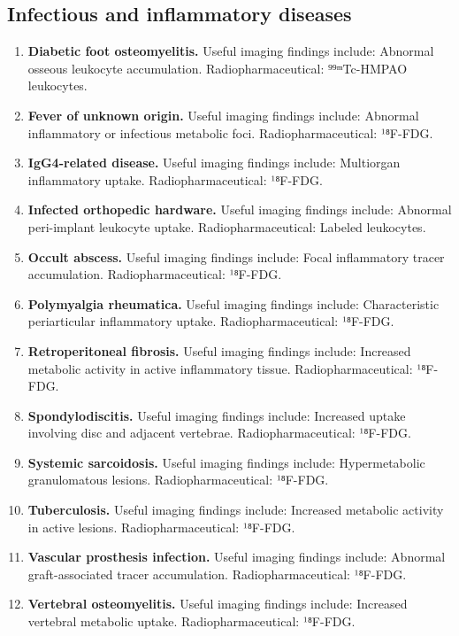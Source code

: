 \subsection{Infectious and inflammatory diseases}
\begin{enumerate}[leftmargin=*,itemsep=0.45em,topsep=0.4em]
\item \textbf{Diabetic foot osteomyelitis.} Useful imaging findings include: Abnormal osseous leukocyte accumulation. Radiopharmaceutical: ⁹⁹ᵐTc-HMPAO leukocytes.
\item \textbf{Fever of unknown origin.} Useful imaging findings include: Abnormal inflammatory or infectious metabolic foci. Radiopharmaceutical: ¹⁸F-FDG.
\item \textbf{IgG4-related disease.} Useful imaging findings include: Multiorgan inflammatory uptake. Radiopharmaceutical: ¹⁸F-FDG.
\item \textbf{Infected orthopedic hardware.} Useful imaging findings include: Abnormal peri-implant leukocyte uptake. Radiopharmaceutical: Labeled leukocytes.
\item \textbf{Occult abscess.} Useful imaging findings include: Focal inflammatory tracer accumulation. Radiopharmaceutical: ¹⁸F-FDG.
\item \textbf{Polymyalgia rheumatica.} Useful imaging findings include: Characteristic periarticular inflammatory uptake. Radiopharmaceutical: ¹⁸F-FDG.
\item \textbf{Retroperitoneal fibrosis.} Useful imaging findings include: Increased metabolic activity in active inflammatory tissue. Radiopharmaceutical: ¹⁸F-FDG.
\item \textbf{Spondylodiscitis.} Useful imaging findings include: Increased uptake involving disc and adjacent vertebrae. Radiopharmaceutical: ¹⁸F-FDG.
\item \textbf{Systemic sarcoidosis.} Useful imaging findings include: Hypermetabolic granulomatous lesions. Radiopharmaceutical: ¹⁸F-FDG.
\item \textbf{Tuberculosis.} Useful imaging findings include: Increased metabolic activity in active lesions. Radiopharmaceutical: ¹⁸F-FDG.
\item \textbf{Vascular prosthesis infection.} Useful imaging findings include: Abnormal graft-associated tracer accumulation. Radiopharmaceutical: ¹⁸F-FDG.
\item \textbf{Vertebral osteomyelitis.} Useful imaging findings include: Increased vertebral metabolic uptake. Radiopharmaceutical: ¹⁸F-FDG.
\end{enumerate}

